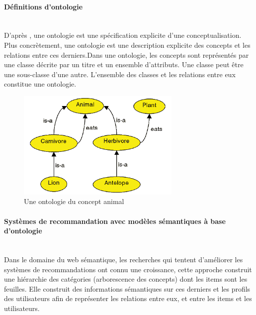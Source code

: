 \documentclass[a4paper,12pt,letterpaper,headsepline,singlespacing,headsepline, french]{report}
\newcommand{\myparagraph}[1]{\paragraph*{#1}\mbox{}\\\indent}
\begin{document}
\myparagraph{Définitions d’ontologie}	
D’après \cite{ref13}, une ontologie est une spécification explicite d'une conceptualisation. 
Plus concrètement, une ontologie est une description explicite des concepts et les relations entre ces derniers.Dans une ontologie, les concepts sont représentés par une classe décrite par un titre et un ensemble d'attributs. Une classe peut être une sous-classe d'une autre. L'ensemble des classes et les relations entre eux constitue une ontologie.
\begin{figure}[H]
	\centering
	\includegraphics[width=0.7\textwidth]{ontologie_Exemple.png}
	\caption{Une ontologie du concept animal \cite{ref29} }
\end{figure}
	
	
\myparagraph{Systèmes de recommandation avec modèles sémantiques à base d’ontologie}
Dans le domaine du web sémantique, les recherches qui tentent d'améliorer les systèmes de recommandations ont connu une croissance, cette approche construit une hiérarchie des catégories (arborescence des concepts) dont les items sont les feuilles. Elle construit des informations sémantiques sur ces derniers et les profils des utilisateurs afin de représenter les relations entre eux, et entre les items et les utilisateurs.
\end{document}
